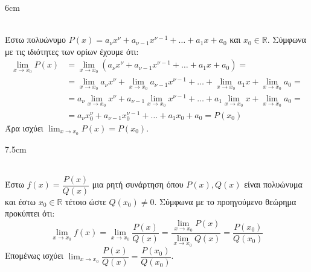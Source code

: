\begin{Thewrhmabox}{6cm}
\label{thewrhma:orio_polywnymikhs}
\end{Thewrhmabox}
\textbf{}\\
Έστω πολυώνυμο $ P(x)=a_\nu x^\nu+a_{\nu-1}x^{\nu-1}+\ldots+a_1x+a_0 $ και $ x_0\in\mathbb{R} $. Σύμφωνα με τις ιδιότητες των ορίων έχουμε ότι:
\begin{align*}
\lim_{x\to x_0}{P(x)}&=\lim_{x\to x_0}{\left( a_\nu x^\nu+a_{\nu-1}x^{\nu-1}+\ldots+a_1x+a_0\right) }=\\
&=\lim_{x\to x_0}{a_\nu x^\nu}+\lim_{x\to x_0}{a_{\nu-1}x^{\nu-1}}+\ldots+\lim_{x\to x_0}{a_1x}+\lim_{x\to x_0}{a_0}=\\
&=a_\nu\lim_{x\to x_0}{x^\nu}+a_{\nu-1}\lim_{x\to x_0}{x^{\nu-1}}+\ldots+a_1\lim_{x\to x_0}{x}+\lim_{x\to x_0}{a_0}=\\
&=a_\nu x_0^\nu+a_{\nu-1}x_0^{\nu-1}+\ldots+a_1x_0+a_0=P(x_0)
\end{align*}
Άρα ισχύει $ {\displaystyle\lim_{x\to x_0}{P(x)}=P(x_0)} $.
\begin{Thewrhmabox}{7.5cm}
\label{thewrhma:orio_rhths}
\end{Thewrhmabox}
\textbf{}\\
Έστω $ f(x)=\dfrac{P(x)}{Q(x)} $ μια ρητή συνάρτηση όπου $ P(x),Q(x) $ είναι πολυώνυμα και έστω $ x_0\in\mathbb{R} $ τέτοιο ώστε $ Q(x_0)\neq0 $. Σύμφωνα με το προηγούμενο θεώρημα προκύπτει ότι:
\[ \lim_{x\to x_0}{f(x)}=\lim_{x\to x_0}{\dfrac{P(x)}{Q(x)}}=\dfrac{\displaystyle\lim_{x\to x_0}{P(x)}}{\displaystyle\lim_{x\to x_0}{Q(x)}}=\dfrac{P(x_0)}{Q(x_0)} \]
Επομένως ισχύει $ {\displaystyle\lim_{x\to x_0}{\dfrac{P(x)}{Q(x)}}=\dfrac{P(x_0)}{Q(x_0)}} $.

